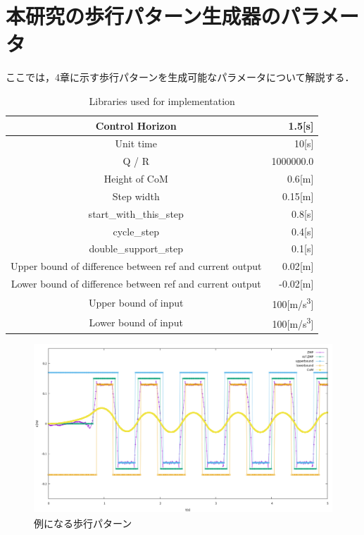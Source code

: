 \section{本研究の歩行パターン生成器のパラメータ}
ここでは，4章に示す歩行パターンを生成可能なパラメータについて解説する．


\begin{table}[H]
  \centering
  \caption{Libraries used for implementation}
  \label{Libraries used for implementation}
  \begin{tabular}{|c|r|}
       \hline \hline
       Control Horizon                                          & 1.5{[}s{]}                      \\ \hline
       Unit time                                                & 10{[}s{]}                       \\ \hline
       Q / R                                                    & 1000000.0                        \\ \hline
       Height of CoM                                            & 0.6{[}m{]}                      \\ \hline
       Step width                                               & 0.15{[}m{]}                     \\ \hline
       start\_with\_this\_step                                  & 0.8{[}s{]}                      \\ \hline
       cycle\_step                                              & 0.4{[}s{]}                      \\ \hline
       double\_support\_step                                    & 0.1{[}s{]}                      \\ \hline \hline
       Upper bound of difference between ref and current output & 0.02{[}m{]}                     \\ \hline
       Lower bound of difference between ref and current output & -0.02{[}m{]}                    \\ \hline
       Upper bound of input                                     & 100{[}m/s\textsuperscript{3}{]} \\ \hline
       Lower bound of input                                     & 100{[}m/s\textsuperscript{3}{]} \\ \hline
  \end{tabular}
\end{table}

\begin{figure}[H]
  \centering
 \includegraphics[keepaspectratio, scale=0.3]
      {images/mpc_sample.png}
 \caption{例になる歩行パターン}
 \label{Fig:例になる歩行パターン}
\end{figure}


\newpage